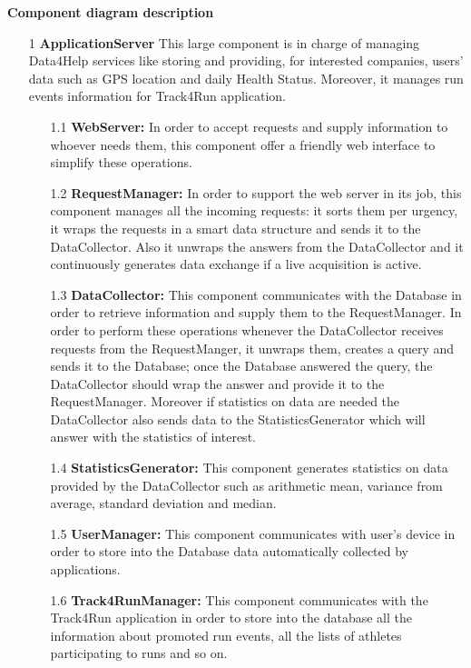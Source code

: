 {\large \textbf{Component diagram description}}
\begin{enumerate}
\item [1] \textbf{ApplicationServer} 
This large component is in charge of managing Data4Help services like storing and providing, for interested companies, users’ data such as GPS location and daily Health Status. Moreover, it manages run events information for Track4Run application.

	\begin{enumerate}
	\item [1.1] \textbf{WebServer:} In order to accept requests and supply information to whoever needs them, this component offer a friendly web interface to simplify these operations.
		
	\item [1.2] \textbf{RequestManager:} In order to support the web server in its job, this component manages all the incoming requests: it sorts them per urgency, it wraps the requests in a smart data structure and sends it to the DataCollector. Also it unwraps the answers from the DataCollector and it continuously generates data exchange if a live acquisition is active.
		
	\item [1.3] \textbf{DataCollector: } This component communicates with the Database in order to retrieve information and supply them to the RequestManager. In order to perform these operations whenever the DataCollector receives requests from the RequestManger, it unwraps them, creates a query and sends it to the Database; once the Database answered the query, the DataCollector should wrap the answer and provide it to the RequestManager. Moreover if statistics on data are needed the DataCollector also sends data to the StatisticsGenerator which will answer with the statistics of interest.
		
	\item [1.4] \textbf{StatisticsGenerator: } This component generates statistics on data provided by the DataCollector such as arithmetic mean, variance from average, standard deviation and median.

	\item [1.5] \textbf{UserManager: } This component communicates with user's device in order to store into the Database data automatically collected by applications.

	\item [1.6] \textbf{Track4RunManager: } This component communicates with the Track4Run application in order to store into the database all the information about promoted run events, all the lists of athletes participating to runs and so on.
	

\end{enumerate}
\end{enumerate}
